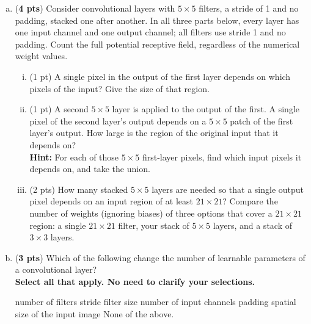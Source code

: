 \documentclass[11pt]{exam}
\begin{document}
\begin{enumerate}[1.]
\begin{enumerate}[(a)]
\item ({\bf 4 pts}) Consider convolutional layers with $5 \times 5$ filters, a stride of 1 and no padding, stacked one after another. In all three parts below, every layer has one input channel and one output channel; all filters use stride 1 and no padding. Count the full potential receptive field, regardless of the numerical weight values.
\begin{enumerate}[(i)]
    \item (1 pt) A single pixel in the output of the first layer depends on which pixels of the input? Give the size of that region.
    \begin{tcolorbox}
\vspace{20ex}
\end{tcolorbox}
    \item (1 pt) A second $5 \times 5$ layer is applied to the output of the first. A single pixel of the second layer's output depends on a $5 \times 5$ patch of the first layer's output. How large is the region of the original input that it depends on?\\
    {\bf Hint:} For each of those $5 \times 5$ first-layer pixels, find which input pixels it depends on, and take the union.
    \begin{tcolorbox}
\vspace{20ex}
\end{tcolorbox}
    \item (2 pts) How many stacked $5 \times 5$ layers are needed so that a single output pixel depends on an input region of at least $21 \times 21$? Compare the number of weights (ignoring biases) of three options that cover a $21 \times 21$ region: a single $21 \times 21$ filter, your stack of $5 \times 5$ layers, and a stack of $3 \times 3$ layers.
    \begin{tcolorbox}
\vspace{40ex}
\end{tcolorbox}
\end{enumerate}



\clearpage


\item ({\bf 3 pts}) Which of the following change the number of learnable parameters of a convolutional layer? \\
\checkboxchar{$\Box$} \checkedchar{$\blacksquare$}
\textbf{Select all that apply. No need to clarify your selections.}
    \begin{checkboxes}
        \choice 
        number of filters
        \choice
        stride
        \choice
        filter size
        \choice
        number of input channels
        \choice
        padding
        \choice
        spatial size of the input image
        \choice
        None of the above.
    \end{checkboxes}



\end{enumerate}
\end{enumerate}
\end{document}
